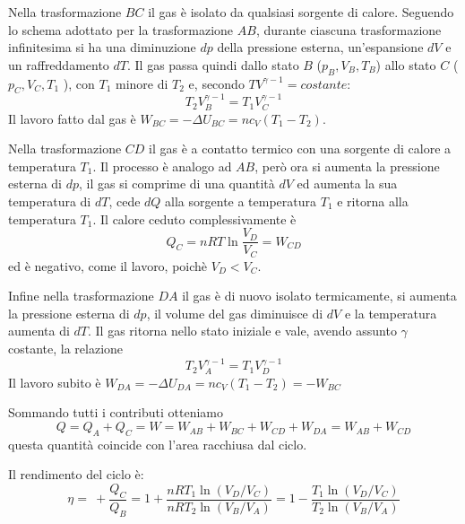 \documentclass[class=book, crop=false, oneside, 12pt]{standalone}
\begin{document}
Nella trasformazione \(B C\) il gas è isolato da qualsiasi sorgente di calore. 
Seguendo lo schema adottato per la trasformazione \(AB\), durante ciascuna trasformazione infinitesima si ha una diminuzione \(d p\) della pressione esterna, un'espansione \(d V\) e un raffreddamento \(d T\). 
Il gas passa quindi dallo stato \(B\) (\(p_B, V_B, T_B\)) allo stato \(C\) ( \(p_C, V_C, T_1\) ), con \(T_1\) minore di \(T_2\) e, secondo \(TV^{\gamma-1} = costante\):
\begin{equation*}
    T_2 V_B^{\gamma - 1} = T_1 V_C^{\gamma-1}
\end{equation*}
Il lavoro fatto dal gas è \(W_{BC} = -\Delta U_{BC} = n c_V \left(T_1 - T_2\right)\).

Nella trasformazione \(C D\) il gas è a contatto termico con una sorgente di calore a temperatura \(T_1\). 
Il processo è analogo ad \(A B\), però ora si aumenta la pressione esterna di \(d p\), il gas si comprime di una quantità \(d V\) ed aumenta la sua temperatura di \(d T\), cede \(d Q\) alla sorgente a temperatura \(T_1\) e ritorna alla temperatura \(T_1\). 
Il calore ceduto complessivamente è 
\begin{equation*}
    Q_C = n R T \ln \frac{V_D}{V_C} = W_{CD}
\end{equation*}
ed è negativo, come il lavoro, poichè \(V_D < V_C\).

Infine nella trasformazione \(D A\) il gas è di nuovo isolato termicamente, si aumenta la pressione esterna di \(d p\), il volume del gas diminuisce di \(d V\) e  la temperatura aumenta di \(d T\). 
Il gas ritorna nello stato iniziale e vale, avendo assunto \(\gamma\) costante, la relazione
\begin{equation*}
    T_2 V_A^{\gamma - 1} = T_1 V_D^{\gamma - 1}
\end{equation*}
Il lavoro subito è \(W_{DA} = -\Delta U_{DA} = n c_V \left(T_1 - T_2\right) = - W_{BC}\)

Sommando tutti i contributi otteniamo
\begin{equation*}
    Q = Q_A + Q_C = W = W_{AB} + W_{BC} + W_{CD} + W_{DA} = W_{AB} + W_{CD}
\end{equation*}
questa quantità coincide con l'area racchiusa dal ciclo.

Il rendimento del ciclo è:
\begin{equation*}
    \eta = \ + \frac{Q_C}{Q_B} = 1 + \frac{n R T_1 \ln \left(V_D / V_C \right) }{n R T_2 \ln \left(V_B / V_A \right)} = 1 - \frac{T_1 \ln \left(V_D / V_C \right) }{T_2 \ln \left(V_B / V_A \right)}
\end{equation*}
\end{document}
